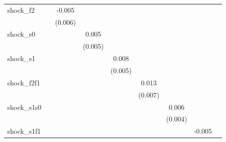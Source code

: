 {\begin{tabular}{l*{8}{c}}
\addlinespace
shock\_f2    &                     &      -0.005         &                     &                     &                     &                     &                     &                     \\
            &                     &     (0.006)         &                     &                     &                     &                     &                     &                     \\
\addlinespace
shock\_s0    &                     &                     &       0.005         &                     &                     &                     &                     &                     \\
            &                     &                     &     (0.005)         &                     &                     &                     &                     &                     \\
\addlinespace
shock\_s1    &                     &                     &                     &       0.008         &                     &                     &                     &                     \\
            &                     &                     &                     &     (0.005)         &                     &                     &                     &                     \\
\addlinespace
shock\_f2f1  &                     &                     &                     &                     &       0.013\sym{*}  &                     &                     &                     \\
            &                     &                     &                     &                     &     (0.007)         &                     &                     &                     \\
\addlinespace
shock\_s1s0  &                     &                     &                     &                     &                     &       0.006         &                     &                     \\
            &                     &                     &                     &                     &                     &     (0.004)         &                     &                     \\
\addlinespace
shock\_s1f1  &                     &                     &                     &                     &                     &                     &      -0.005         &                     \\

\end{tabular}}
